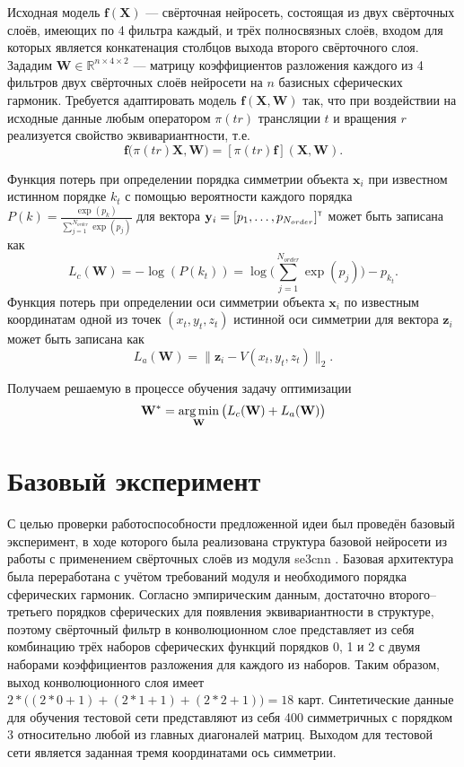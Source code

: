 \documentclass[12pt,twosides]{article}
\begin{document}
	Исходная модель $\mathbf{f(X)}$ --- свёрточная нейросеть, состоящая из двух свёрточных слоёв, имеющих по 4 фильтра каждый, и трёх полносвязных слоёв, входом для которых является конкатенация столбцов выхода второго свёрточного слоя. Зададим $\mathbf{W}\in\mathbb{R}^{n\times4\times2}$ --- матрицу коэффициентов разложения каждого из 4 фильтров двух свёрточных слоёв нейросети на $n$ базисных сферических гармоник. Требуется адаптировать модель $\mathbf{f(X, W)}$ так, что при воздействии на исходные данные любым оператором $\pi(tr)$ трансляции $t$ и вращения $r$ реализуется свойство эквивариантности, т.е.
	$$\mathbf{f}(\pi(tr)\mathbf{X,W)}=[\pi(tr)\mathbf{f}]\mathbf{(X,W)}.$$
	
	Функция потерь при определении порядка симметрии объекта $\mathbf{x}_i$ при известном истинном порядке $k_{t}$ с помощью вероятности каждого порядка   $P(k)=\frac{\exp(p_k)}{\sum_{j=1}^{N_{order}}\exp(p_j)}$ для вектора $\mathbf{y}_i=[p_1,\dots,p_{N_{order}}]^{\text{\tiny\sffamily\upshape\mdseries T}}$ может быть записана как
	$$L_c(\mathbf{W})=-\log(P(k_{t}))=\log\Bigg(\sum_{j=1}^{N_{order}}\exp(p_j)\Bigg)-p_{k_{t}}.$$
	Функция потерь при определении оси симметрии объекта $\mathbf{x}_i$ по известным координатам одной из точек $(x_{t},y_{t},z_{t})$ истинной оси симметрии для вектора $\mathbf{z}_i$ может быть записана как
	$$L_a(\mathbf{W})=\|\mathbf{z}_i-V(x_{t},y_{t},z_{t})\|_2.$$
	
	Получаем решаемую в процессе обучения задачу оптимизации
	$$\mathbf{W}^*=\argmin_{\textbf{W}}\big(L_c(\mathbf{W})+L_a(\mathbf{W})\big)$$
	
	\section{Базовый эксперимент}
	С целью проверки работоспособности предложенной идеи был проведён базовый эксперимент, в ходе которого была реализована структура базовой нейросети из работы \cite{DeepSymmetry18} с применением свёрточных слоёв из модуля se3cnn \cite{DBLP:journals/corr/abs-1807-02547}. Базовая архитектура была переработана с учётом требований модуля и необходимого порядка сферических гармоник. Согласно эмпирическим данным, достаточно второго--третьего порядков сферических для появления эквивариантности в структуре, поэтому свёрточный фильтр в конволюционном слое представляет из себя комбинацию трёх наборов сферических функций порядков 0, 1 и 2 с двумя наборами коэффициентов разложения для каждого из наборов. Таким образом, выход конволюционного слоя имеет $2*\big((2*0+1)+(2*1+1)+(2*2+1)\big)=18$ карт. 
	Синтетические данные для обучения тестовой сети представляют из себя 400 симметричных с порядком 3 относительно любой из главных диагоналей матриц. Выходом для тестовой сети является заданная тремя координатами ось симметрии.
	
\end{document}
